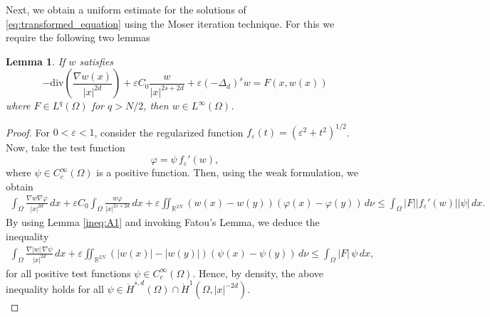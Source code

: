 \documentclass[11pt]{article}
\newtheorem{lemma}{Lemma}[section] %
\newcommand{\om} {\Omega}
\newcommand{\rtwon}{\mathbb{R}^{2N}}
\begin{document}

Next, we obtain a uniform estimate for the solutions of \eqref{eq:transformed_equation} using the Moser iteration technique. For this we require the following two lemmas



\begin{lemma}\label{lem:moser_iter_lem1}
 If $w$ satisfies 
 \begin{equation*}
      -\mathrm{div}\left( \frac{\nabla w(x)}{|x|^{2 d}}\right) + \varepsilon C_0 \frac{w}{|x|^{2s + 2d}} + \varepsilon (-\Delta_{d})^s w  = F(x,w(x))
 \end{equation*}
  where $F \in L^q(\om)$ for $q > N/2$, then $w \in L^{\infty}(\om)$.   
\end{lemma}
\begin{proof}
For \( 0 < \varepsilon < 1 \), consider the regularized function $f_\varepsilon(t) = \left( \varepsilon^2 + t^2 \right)^{1/2}$. Now, take the test function
\begin{equation*}
    \varphi = \psi \, f_\varepsilon'(w),
\end{equation*}
where \( \psi \in C_c^\infty(\Omega) \) is a positive function.
Then, using the weak formulation, we obtain
\begin{equation*}
\begin{aligned}
    \int_\Omega \frac{\nabla w  \nabla \varphi}{|x|^{2d}} \, dx 
    + \varepsilon C_0 \int_\Omega \frac{w \varphi}{|x|^{2s + 2d}} \, dx 
    + \varepsilon \iint_{\rtwon} (w(x) - w(y))(\varphi(x) - \varphi(y)) \, d\nu 
    \leq \int_\Omega |F| \left| f_\varepsilon'(w) \right| |\psi| \, dx.
\end{aligned}
\end{equation*}
By using Lemma \ref{ineq:A1} and invoking Fatou's Lemma, we deduce the inequality
\begin{equation*}
\begin{aligned}
    \int_\Omega \frac{\nabla |w| \,  \nabla \psi}{|x|^{2d}} \, dx 
    + \varepsilon \iint_{\mathbb{R}^{2N}} \left( |w(x)| - |w(y)| \right) ( \psi(x) - \psi(y) ) \, d\nu 
    \leq \int_\Omega |F| \, \psi \, dx,
\end{aligned}
\end{equation*}
for all positive test functions \( \psi \in C_c^\infty(\Omega) \). Hence, by density, the above inequality holds for all $ \psi \in \dot{H}^{s,d}(\Omega) \cap \dot{H}^1(\Omega, |x|^{-2d})$. \\


\end{proof}
\end{document}
